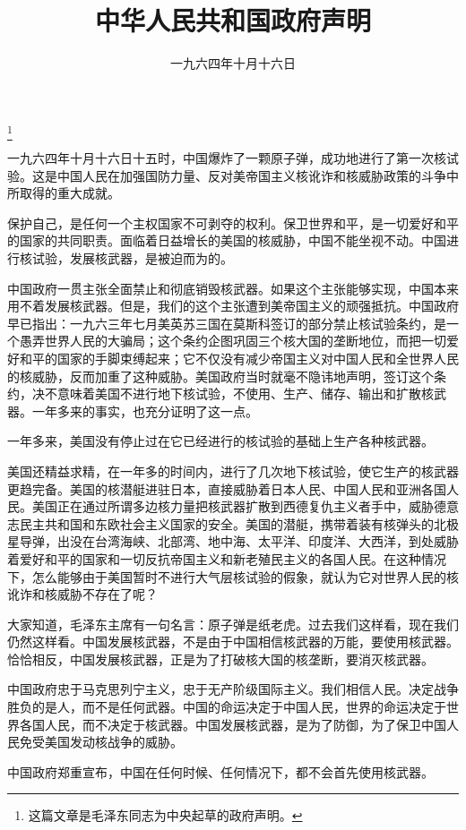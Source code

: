 
\title{中华人民共和国政府声明}
\date{一九六四年十月十六日}
\thanks{这篇文章是毛泽东同志为中央起草的政府声明。}
\maketitle


一九六四年十月十六日十五时，中国爆炸了一颗原子弹，成功地进行了第一次核试验。这是中国人民在加强国防力量、反对美帝国主义核讹诈和核威胁政策的斗争中所取得的重大成就。

保护自己，是任何一个主权国家不可剥夺的权利。保卫世界和平，是一切爱好和平的国家的共同职责。面临着日益增长的美国的核威胁，中国不能坐视不动。中国进行核试验，发展核武器，是被迫而为的。

中国政府一贯主张全面禁止和彻底销毁核武器。如果这个主张能够实现，中国本来用不着发展核武器。但是，我们的这个主张遭到美帝国主义的顽强抵抗。中国政府早已指出：一九六三年七月美英苏三国在莫斯科签订的部分禁止核试验条约，是一个愚弄世界人民的大骗局；这个条约企图巩固三个核大国的垄断地位，而把一切爱好和平的国家的手脚束缚起来；它不仅没有减少帝国主义对中国人民和全世界人民的核威胁，反而加重了这种威胁。美国政府当时就毫不隐讳地声明，签订这个条约，决不意味着美国不进行地下核试验，不使用、生产、储存、输出和扩散核武器。一年多来的事实，也充分证明了这一点。

一年多来，美国没有停止过在它已经进行的核试验的基础上生产各种核武器。

美国还精益求精，在一年多的时间内，进行了几次地下核试验，使它生产的核武器更趋完备。美国的核潜艇进驻日本，直接威胁着日本人民、中国人民和亚洲各国人民。美国正在通过所谓多边核力量把核武器扩散到西德复仇主义者手中，威胁德意志民主共和国和东欧社会主义国家的安全。美国的潜艇，携带着装有核弹头的北极星导弹，出没在台湾海峡、北部湾、地中海、太平洋、印度洋、大西洋，到处威胁着爱好和平的国家和一切反抗帝国主义和新老殖民主义的各国人民。在这种情况下，怎么能够由于美国暂时不进行大气层核试验的假象，就认为它对世界人民的核讹诈和核威胁不存在了呢？

大家知道，毛泽东主席有一句名言：原子弹是纸老虎。过去我们这样看，现在我们仍然这样看。中国发展核武器，不是由于中国相信核武器的万能，要使用核武器。恰恰相反，中国发展核武器，正是为了打破核大国的核垄断，要消灭核武器。

中国政府忠于马克思列宁主义，忠于无产阶级国际主义。我们相信人民。决定战争胜负的是人，而不是任何武器。中国的命运决定于中国人民，世界的命运决定于世界各国人民，而不决定于核武器。中国发展核武器，是为了防御，为了保卫中国人民免受美国发动核战争的威胁。

中国政府郑重宣布，中国在任何时候、任何情况下，都不会首先使用核武器。

